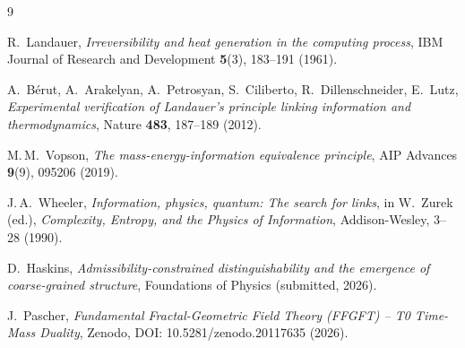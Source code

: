 \begin{thebibliography}{9}

R.~Landauer,
\textit{Irreversibility and heat generation in the computing process},
IBM Journal of Research and Development \textbf{5}(3), 183--191 (1961).

A.~Bérut, A.~Arakelyan, A.~Petrosyan, S.~Ciliberto,
R.~Dillenschneider, E.~Lutz,
\textit{Experimental verification of Landauer's principle linking
information and thermodynamics},
Nature \textbf{483}, 187--189 (2012).

M.\,M.~Vopson,
\textit{The mass-energy-information equivalence principle},
AIP Advances \textbf{9}(9), 095206 (2019).

J.\,A.~Wheeler,
\textit{Information, physics, quantum: The search for links},
in W.~Zurek (ed.), \textit{Complexity, Entropy, and the Physics
of Information}, Addison-Wesley, 3--28 (1990).

D.~Haskins,
\textit{Admissibility-constrained distinguishability and the emergence
of coarse-grained structure},
Foundations of Physics (submitted, 2026).

J.~Pascher,
\textit{Fundamental Fractal-Geometric Field Theory (FFGFT) --
T0 Time-Mass Duality},
Zenodo, DOI: 10.5281/zenodo.20117635 (2026).

\end{thebibliography}
